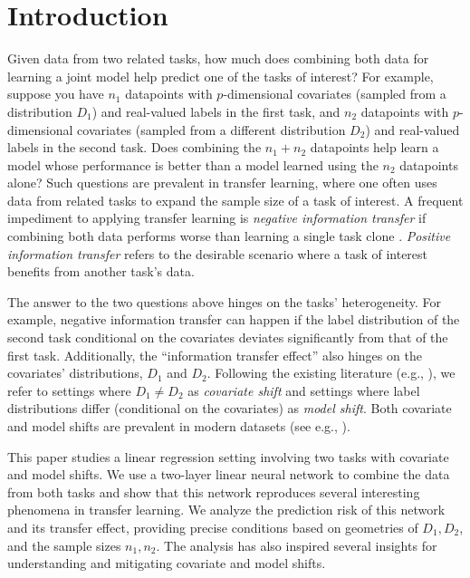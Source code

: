 \section{Introduction}\label{sec_introduction}

Given data from two related tasks, how much does combining both data for learning a joint model help predict one of the tasks of interest?
For example, suppose you have $n_1$ datapoints with $p$-dimensional covariates (sampled from a distribution $D_1$) and real-valued labels in the first task, and $n_2$ datapoints with $p$-dimensional covariates (sampled from a different distribution $D_2$) and real-valued labels in the second task. 
Does combining the $n_1 + n_2$ datapoints help learn a model whose performance is better than a model learned using the $n_2$ datapoints alone?
Such questions are prevalent in transfer learning, where one often uses data from related tasks to expand the sample size of a task of interest.
A frequent impediment to applying transfer learning is \textit{negative information transfer} if combining both data performs worse than learning a single task clone \cite{PY09}.
\textit{Positive information transfer} refers to the desirable scenario where a task of interest benefits from another task's data.

The answer to the two questions above hinges on the tasks' heterogeneity.
For example, negative information transfer can happen if the label distribution of the second task conditional on the covariates deviates significantly from that of the first task.
Additionally, the ``information transfer effect'' also hinges on the covariates' distributions, $D_1$ and $D_2$.
Following the existing literature (e.g., \citet{kouw2018introduction}), we refer to settings where $D_1 \neq D_2$ as \textit{covariate shift} and settings where label distributions differ (conditional on the covariates) as \textit{model shift}.
Both covariate and model shifts are prevalent in modern datasets (see e.g., \citet{koh2021wilds}).

This paper studies a linear regression setting involving two tasks with covariate and model shifts.
We use a two-layer linear neural network to combine the data from both tasks and show that this network reproduces several interesting phenomena in transfer learning.
We analyze the prediction risk of this network and its transfer effect, providing precise conditions based on geometries of $D_1, D_2$, and the sample sizes $n_1, n_2$.
The analysis has also inspired several insights for understanding and mitigating covariate and model shifts.

